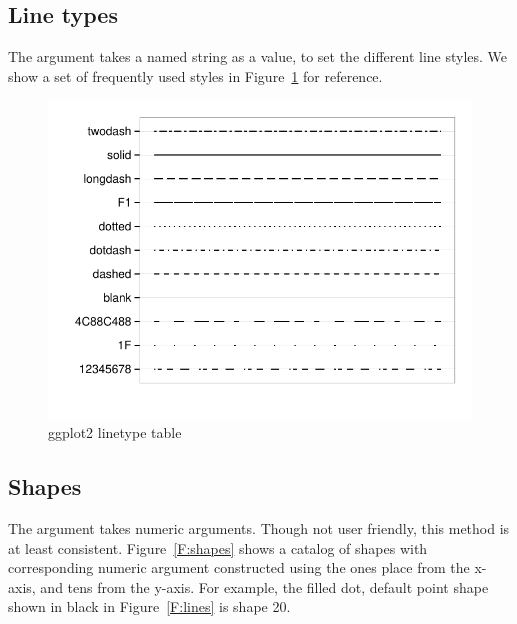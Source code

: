 \documentclass[nojss]{jss}\usepackage[]{graphicx}\usepackage[]{color}
\makeatletter
\def\maxwidth{ %
  \ifdim\Gin@nat@width>\linewidth
    \linewidth
  \else
    \Gin@nat@width
  \fi
}
\newenvironment{knitrout}{}{} %
\makeatother
\begin{document}
\subsection{Line types}\label{S:linetypes}
The  argument takes a named string as a value, to set the different line styles. We show a set of frequently used styles in Figure~\ref{F:linetypes} for reference.
\begin{knitrout}\footnotesize
{}\color{fgcolor}\begin{figure}[htpb]

{\centering \includegraphics[width=\maxwidth]{figure/beamer-linetypes-1} 

}

\caption[ggplot2 linetype table]{ggplot2 linetype table\label{F:linetypes}}
\end{figure}


\end{knitrout}

\subsection{Shapes}\label{S:shapes}
The  argument takes numeric arguments. Though not user friendly, this method is at least consistent. Figure~\ref{F:shapes} shows a catalog of shapes with corresponding numeric argument constructed using the ones place from the x-axis, and tens from the y-axis. For example, the filled dot, default point shape shown in black in Figure~\ref{F:lines} is shape 20.
\end{document}
